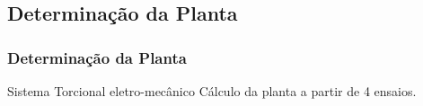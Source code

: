\documentclass{beamer}
\begin{document}
\subsection{Determinação da Planta}
\begin{frame}
\frametitle{Determinação da Planta}
	\begin{block}{Sistema Torcional eletro-mecânico}
		Cálculo da planta a partir de 4 ensaios.
	\begin{center}
	\end{center}
	\end{block}
\end{frame}
\end{document}
